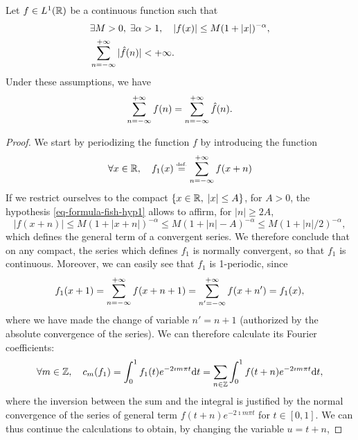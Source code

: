 \begin{thm}
\label{thm-formula-fish-continue}
Let $ f \in L^1 (\mathbb{R}) $ be a continuous function such that
\begin{align}
\label{eq-formula-fish-hyp1}
& \exists M> 0, \; \exists \alpha> 1, \quad | f(x) | \leq M (1+ | x |)^{- \alpha}, \\
\label{eq-formula-fish-hyp2}
& \sum_{n = -\infty}^{+\infty}{| \hat{f} (n) |} <+ \infty.
\end{align}
Under these assumptions, we have
\begin{equation}
\label{eq-formula-fish-continue}
\sum_{n = -\infty}^{+\infty}{f(n)} = \sum_{n = -\infty}^{+\infty}{\hat{f} (n)}.
\end{equation}
\end{thm}
\begin{proof}
  We start by periodizing the function $ f $ by introducing the function
\begin{equation*}
\forall x \in \mathbb{R}, \quad f_1 (x) \stackrel{\mbox{\upshape\tiny def.}}{=} \sum_{n = -\infty}^{+\infty}{f(x + n)}
\end{equation*}
If we restrict ourselves to the compact $ \{x \in \mathbb{R}, \; | x | \leq A\} $, for $ A> 0 $, the hypothesis \eqref{eq-formula-fish-hyp1} allows to affirm, for $ | n | \geq 2A $,
\begin{equation*}
| f(x + n) | \leq M (1+ | x + n |)^{- \alpha} \leq M (1+ | n | -A)^{- \alpha} \leq M (1+ | n | / 2)^{-\alpha},
\end{equation*}
which defines the general term of a convergent series. We therefore conclude that on any compact, the series which defines $ f_1 $ is normally convergent, so that $ f_1 $ is continuous. Moreover, we can easily see that $ f_1 $ is 1-periodic, since
\begin{equation*}
f_1 (x + 1) = \sum_{n = -\infty}^{+\infty}{f(x + n + 1)} = \sum_{n'= -\infty}^{+\infty}{f(x + n')} = f_1 (x),
\end{equation*}
where we have made the change of variable $ n'= n + 1 $ (authorized by the absolute convergence of the series). We can therefore calculate its Fourier coefficients:
\begin{equation*}
\forall m \in \mathbb{Z}, \quad c_m (f_1) = \int_0^1{f_1 (t) e^{- 2 \imath m \pi t} \mathrm{d} t} = \sum_{n \in \mathbb{Z}}{\int_0^1{f(t + n) e^{- 2 \imath m \pi t} \mathrm{d} t}},
\end{equation*}
where the inversion between the sum and the integral is justified by the normal convergence of the series of general term $ f(t + n) e^{- 2 \imath m \pi t} $ for $ t \in [0 , 1] $. We can thus continue the calculations to obtain, by changing the variable $ u = t + n $,

\end{proof}
